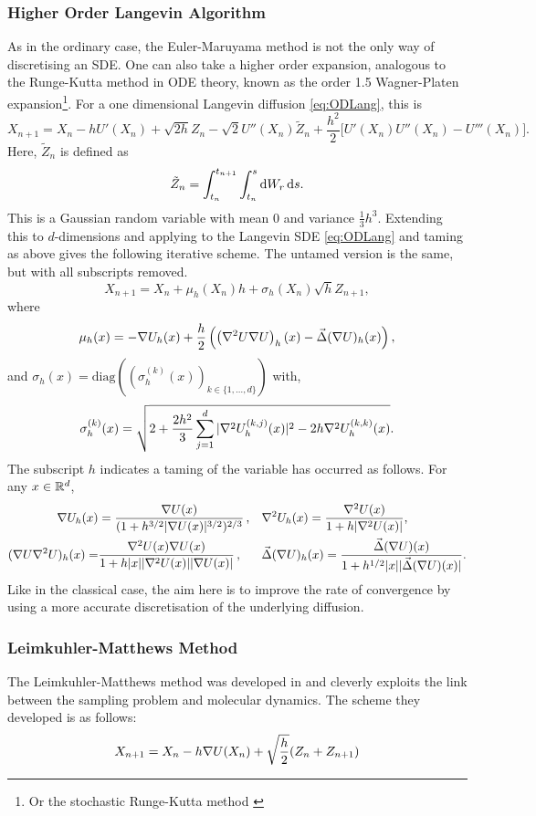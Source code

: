 \subsubsection{Higher Order Langevin Algorithm}
As in the ordinary case, the Euler-Maruyama method is not the only way of discretising an SDE. One can also take a higher order expansion, analogous to the Runge-Kutta method in ODE theory, known as the order 1.5 Wagner-Platen expansion\footnote{Or the stochastic Runge-Kutta method \cite{Schaffter10numericalintegration}}. For a one dimensional Langevin diffusion \eqref{eq:ODLang}, this is 
\[X_{n+1} = X_n -hU'(X_n)+\sqrt{2h}Z_n -\sqrt{2} U''(X_n) \tilde{Z}_n +\frac{ h^2 }{2}\bigg\lbrack U'(X_n)U''(X_n)-U'''(X_n)\bigg\rbrack.  \]
Here, \(\tilde{Z}_n\) is defined as
\[  \tilde{Z}_n = \int_{t_n}^{t_{n+1}} \int_{t_n}^s \mathop{}\!\mathrm{d} W_r \mathop{}\!\mathrm{d} s. \]
This is a Gaussian random variable with mean \(0\) and variance \(\frac{1}{3}h^3 \). Extending this to \(d\)-dimensions and applying to the Langevin SDE \eqref{eq:ODLang} and taming as above gives the following iterative scheme. The untamed version is the same, but with all subscripts removed. 
\[X_{n+1} = X_n + \mu_{h}(X_n)h +\sigma_{h}(X_n)\sqrt{h}Z_{n+1},\]
where
\[\mu_{h}(x) = -\nabla U_{h}(x) +\frac{h}{2}\left( \left( \nabla^2U\nabla U\right)_{h}(x) - \vec{\Delta}(\nabla U)_{h}(x)\right) ,\]
and \(\sigma_{h}(x) = \text{diag}\left(\left( \sigma_{h}^{(k)}(x)\right)_{k\in \lbrace 1,\dots,d\rbrace}\right)\) with,
\[\sigma_{h}^{(k)}(x) = \sqrt{2+\frac{2h^2}{3}\sum_{j=1}^d |\nabla^2 U_{h}^{(k,j)}(x)|^2 - 2h \nabla^2 U_{h}^{(k,k)}(x)}.\]
The subscript \(h\) indicates a taming of the variable has occurred as follows. For any \(x\in \mathbb{R}^d\),
\begin{align*}
    \nabla U_h(x) &=\frac{\nabla U(x)}{(1+h^{3/2}|\nabla U(x)|^{3/2})^{2/3}}\, , && \nabla^2U_h(x) = \frac{\nabla^2 U(x)}{1+h|\nabla^2 U(x)|} ,\\
    (\nabla U\nabla^2U)_h(x) =&\frac{\nabla^2U(x)\nabla U(x)}{1+h|x||\nabla^2U(x)||\nabla U(x)|}\, , && \vec{\Delta}(\nabla U)_h(x) = \frac{\vec{\Delta}(\nabla U)(x)}{1+h^{1/2}|x||\vec{\Delta}(\nabla U)(x)|}.
\end{align*}
Like in the classical case, the aim here is to improve the rate of convergence by using a more accurate discretisation of the underlying diffusion.

\subsubsection{Leimkuhler-Matthews Method}
The Leimkuhler-Matthews method was developed in \cite{LM12} and cleverly exploits the link between the sampling problem and molecular dynamics. The scheme they developed is as follows:
\begin{equation} X_{n+1} = X_n - h \nabla U (X_n) +\sqrt{\frac{h}{2}} (Z_n+Z_{n+1}) \label{eq:LM} \end{equation}

